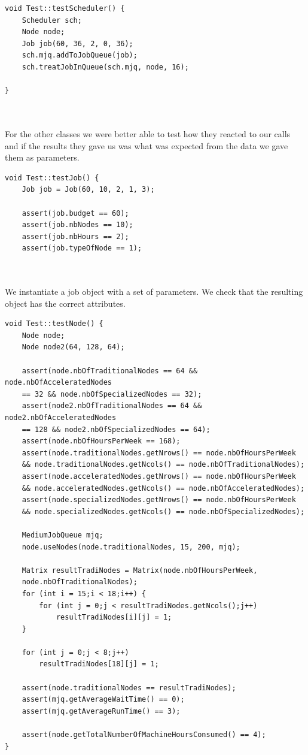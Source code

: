 \documentclass [10 pt, a4 paper]{report}
\begin{document}
\begin{lstlisting}[caption=testScheduler function of the class Test, label={lst:code1}, frame=single]
void Test::testScheduler() {
	Scheduler sch;
	Node node;
	Job job(60, 36, 2, 0, 36);
	sch.mjq.addToJobQueue(job);
	sch.treatJobInQueue(sch.mjq, node, 16);

}
\end{lstlisting}

\noindent
\\ \\ 
For the other classes we were better able to test how they reacted to our calls and if the results they gave us was what was expected from the data we gave them as parameters.

\clearpage
\begin{lstlisting}[caption=testJob function of the class Test, label={lst:code1}, frame=single]
void Test::testJob() {
	Job job = Job(60, 10, 2, 1, 3);

	assert(job.budget == 60);
	assert(job.nbNodes == 10);
	assert(job.nbHours == 2);
	assert(job.typeOfNode == 1);
\end{lstlisting}

\noindent
\\ \\ 
We instantiate a job object with a set of parameters. We check that the resulting object has the correct attributes.


\begin{lstlisting}[caption=testNode function of the class Test, label={lst:code1}, frame=single]
void Test::testNode() {
	Node node;
	Node node2(64, 128, 64);

	assert(node.nbOfTraditionalNodes == 64 && node.nbOfAcceleratedNodes 
	== 32 && node.nbOfSpecializedNodes == 32);
	assert(node2.nbOfTraditionalNodes == 64 && node2.nbOfAcceleratedNodes 
	== 128 && node2.nbOfSpecializedNodes == 64);
	assert(node.nbOfHoursPerWeek == 168);
	assert(node.traditionalNodes.getNrows() == node.nbOfHoursPerWeek 
	&& node.traditionalNodes.getNcols() == node.nbOfTraditionalNodes);
	assert(node.acceleratedNodes.getNrows() == node.nbOfHoursPerWeek 
	&& node.acceleratedNodes.getNcols() == node.nbOfAcceleratedNodes);
	assert(node.specializedNodes.getNrows() == node.nbOfHoursPerWeek 
	&& node.specializedNodes.getNcols() == node.nbOfSpecializedNodes);

	MediumJobQueue mjq;
	node.useNodes(node.traditionalNodes, 15, 200, mjq);
	
	Matrix resultTradiNodes = Matrix(node.nbOfHoursPerWeek, 
	node.nbOfTraditionalNodes);
	for (int i = 15;i < 18;i++) {
		for (int j = 0;j < resultTradiNodes.getNcols();j++)
			resultTradiNodes[i][j] = 1;
	}

	for (int j = 0;j < 8;j++)
		resultTradiNodes[18][j] = 1;

	assert(node.traditionalNodes == resultTradiNodes);
	assert(mjq.getAverageWaitTime() == 0);
	assert(mjq.getAverageRunTime() == 3);

	assert(node.getTotalNumberOfMachineHoursConsumed() == 4);
}
\end{lstlisting}
\end{document}
